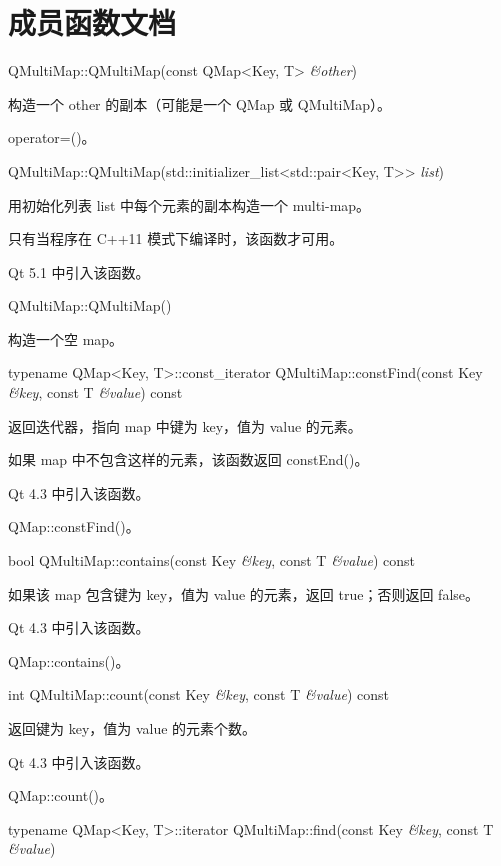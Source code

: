\section{成员函数文档}

QMultiMap::QMultiMap(const QMap<Key, T> \emph{\&other})

构造一个 other 的副本（可能是一个 QMap 或 QMultiMap）。

\begin{seeAlso}
operator=()。
\end{seeAlso}

QMultiMap::QMultiMap(std::initializer\_list<std::pair<Key, T>> \emph{list})

用初始化列表 list 中每个元素的副本构造一个 multi-map。

只有当程序在 C++11 模式下编译时，该函数才可用。

Qt 5.1 中引入该函数。

QMultiMap::QMultiMap()

构造一个空 map。

typename QMap<Key, T>::const\_iterator QMultiMap::constFind(const Key \emph{\&key}, const T \emph{\&value}) const

返回迭代器，指向 map 中键为 key，值为 value 的元素。

如果 map 中不包含这样的元素，该函数返回 constEnd()。

Qt 4.3 中引入该函数。

\begin{seeAlso}
QMap::constFind()。
\end{seeAlso}

bool QMultiMap::contains(const Key \emph{\&key}, const T \emph{\&value}) const

如果该 map 包含键为 key，值为 value 的元素，返回 true；否则返回 false。

Qt 4.3 中引入该函数。

\begin{seeAlso}
QMap::contains()。
\end{seeAlso}

int QMultiMap::count(const Key \emph{\&key}, const T  \emph{\&value}) const

返回键为 key，值为 value 的元素个数。

Qt 4.3 中引入该函数。

\begin{seeAlso}
QMap::count()。
\end{seeAlso}

typename QMap<Key, T>::iterator QMultiMap::find(const Key \emph{\&key}, const T \emph{\&value})

